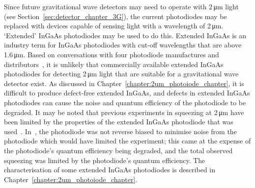 Since future gravitational wave detectors may need to operate with 2\,\si{\micro\metre} light (see Section~\ref{sec:detector_chapter_3G}), the current photodiodes may be replaced with devices capable of sensing light with a wavelength of 2\,\si{\micro\metre}. `Extended' InGaAs photodiodes may be used to do this. Extended InGaAs is an industry term for InGaAs photodiodes with cut-off wavelengths that are above 1.6\,\si{\micro\metre}. Based on conversations with four photodiode manufactures and distributors~\cite{Gasparian2018,Hornby2018,Miron2018,Kalinina2018}, it is unlikely that commercially available extended InGaAs photodiodes for detecting 2\,\si{\micro\metre} light that are suitable for a gravitational wave detector exist. As discussed in Chapter~\ref{chapter:2um_photoiode_chapter}, it is difficult to produce defect-free extended InGaAs, and defects in extended InGaAs photodiodes can cause the noise and quantum efficiency of the photodiode to be degraded. It may be noted that previous experiments in squeezing at 2\,\si{\micro\metre} have been limited by the properties of the extended InGaAs photodiode that was used~\cite{Mansell2018a,Yap2019}. In~\cite{Mansell2018a}, the photodiode was not reverse biased to minimise noise from the photodiode which would have limited the experiment; this came at the expense of the photodiode's quantum efficiency being degraded, and the total observed squeezing was limited by the photodiode's quantum efficiency. The characterisation of some extended InGaAs photodiodes is described in Chapter~\ref{chapter:2um_photoiode_chapter}.
